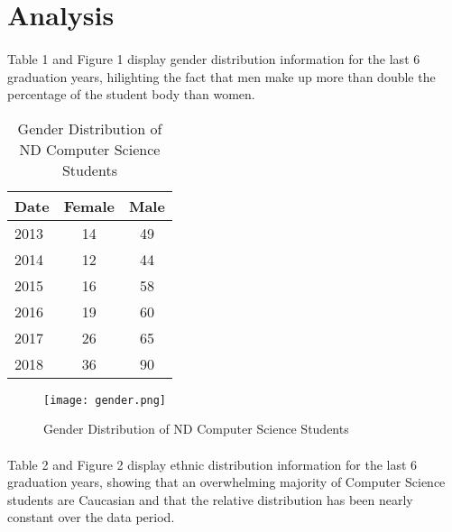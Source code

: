 \documentclass{article}
\begin{document}
	\section{Analysis}
	
	\paragraph{}
	Table 1 and Figure 1 display gender distribution information for the last 6 graduation years, hilighting the fact that men make up more than double the percentage of the student body than women.
	
	\begin{table}[H]
	
		\centering
		
		\caption{Gender Distribution of ND Computer Science Students}
		
		\label{tab:table1}
		
		\begin{tabular}{l||c|c}
				
			Date & Female & Male\\
				
			\hline
				
			2013 & 14 & 49\\
			
			2014 & 12 & 44\\
			
			2015 & 16 & 58\\
			
			2016 & 19 & 60\\
			
			2017 & 26 & 65\\
			
			2018 & 36 & 90\\
				
		\end{tabular}
			
	\end{table}
	
	\begin{figure}[H]
		\texttt{[image: gender.png]}
		
		\caption{Gender Distribution of ND Computer Science Students}
		
		\label{fig:figure1}
		
	\end{figure}
	
	\paragraph{}
	Table 2 and Figure 2 display ethnic distribution information for the last 6 graduation years, showing that an overwhelming majority of Computer Science students are Caucasian and that the relative distribution has been nearly constant over the data period.
		
\end{document}
